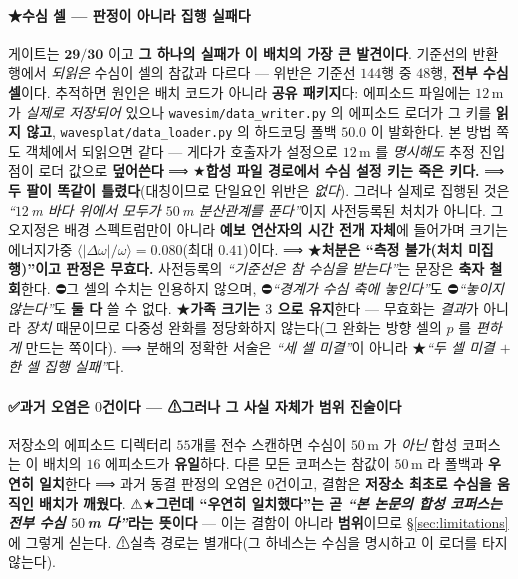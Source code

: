 \documentclass[11pt]{report}
\numberwithin{equation}{chapter}
\numberwithin{figure}{chapter}
\numberwithin{table}{chapter}
\begin{document}
\paragraph{★수심 셀 --- 판정이 아니라 집행 실패다}
게이트는 $\mathbf{29/30}$ 이고 \textbf{그 하나의 실패가 이 배치의 가장 큰 발견이다}. 기준선의
반환 행에서 \emph{되읽은} 수심이 셀의 참값과 다르다 --- 위반은 기준선 $144$행 중 $48$행,
\textbf{전부 수심 셀}이다. 추적하면 원인은 배치 코드가 아니라 \textbf{공유 패키지}다:
에피소드 파일에는 $12$\,m 가 \emph{실제로 저장되어} 있으나 \texttt{wavesim/data\_writer.py}
의 에피소드 로더가 그 키를 \textbf{읽지 않고}, \texttt{wavesplat/data\_loader.py} 의
하드코딩 폴백 $50.0$ 이 발화한다. 본 방법 쪽도 객체에서 되읽으면 같다 --- 게다가 호출자가
설정으로 $12$\,m 를 \emph{명시해도} 추정 진입점이 로더 값으로 \textbf{덮어쓴다}
⟹ ★\textbf{합성 파일 경로에서 수심 설정 키는 죽은 키다.}
⟹ \textbf{두 팔이 똑같이 틀렸다}(대칭이므로 단일요인 위반은 \emph{없다}). 그러나 실제로
집행된 것은 \emph{``$12$\,m 바다 위에서 모두가 $50$\,m 분산관계를 푼다''}이지 사전등록된
처치가 아니다. 그 오지정은 배경 스펙트럼만이 아니라 \textbf{예보 연산자의 시간 전개 자체}에
들어가며 크기는 에너지가중 $\langle |\Delta\omega|/\omega \rangle = 0.080$(최대 $0.41$)이다.
⟹ ★\textbf{처분은 ``측정 불가(처치 미집행)''이고 판정은 무효다.} 사전등록의
\emph{``기준선은 참 수심을 받는다''}는 문장은 \textbf{축자 철회}한다. ⛔그 셀의 수치는
인용하지 않으며, ⛔\emph{``경계가 수심 축에 놓인다''}도 ⛔\emph{``놓이지 않는다''}도
\textbf{둘 다} 쓸 수 없다. ★\textbf{가족 크기는 $3$ 으로 유지}한다 --- 무효화는 \emph{결과}가
아니라 \emph{장치} 때문이므로 다중성 완화를 정당화하지 않는다(그 완화는 방향 셀의 $p$ 를
\emph{편하게} 만드는 쪽이다). ⟹ 분해의 정확한 서술은 \emph{``세 셀 미결''}이 아니라
★\emph{``두 셀 미결 $+$ 한 셀 집행 실패''}다.

\paragraph{✅과거 오염은 $0$건이다 --- ⚠그러나 그 사실 자체가 범위 진술이다}
저장소의 에피소드 디렉터리 $55$개를 전수 스캔하면 수심이 $50$\,m 가 \emph{아닌} 합성
코퍼스는 이 배치의 $16$ 에피소드가 \textbf{유일}하다. 다른 모든 코퍼스는 참값이 $50$\,m 라
폴백과 \textbf{우연히 일치}한다 ⟹ 과거 동결 판정의 오염은 $0$건이고, 결함은 \textbf{저장소
최초로 수심을 움직인 배치가 깨웠다}. ⚠★\textbf{그런데 ``우연히 일치했다''는 곧
\emph{``본 논문의 합성 코퍼스는 전부 수심 $50$\,m 다''}라는 뜻이다} --- 이는 결함이 아니라
\textbf{범위}이므로 \S\ref{sec:limitations} 에 그렇게 싣는다. ⚠실측 경로는 별개다(그 하네스는
수심을 명시하고 이 로더를 타지 않는다).
\end{document}
